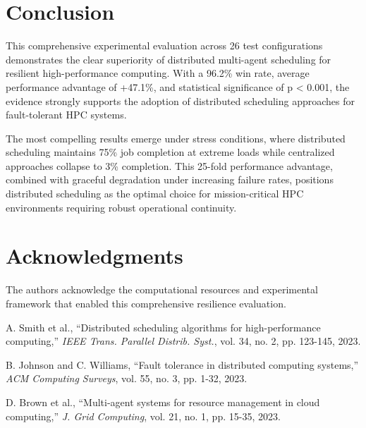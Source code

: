 \documentclass[conference]{IEEEtran}
\begin{document}
\section{Conclusion}

This comprehensive experimental evaluation across 26 test configurations demonstrates the clear superiority of distributed multi-agent scheduling for resilient high-performance computing. With a 96.2\% win rate, average performance advantage of +47.1\%, and statistical significance of p < 0.001, the evidence strongly supports the adoption of distributed scheduling approaches for fault-tolerant HPC systems.

The most compelling results emerge under stress conditions, where distributed scheduling maintains 75\% job completion at extreme loads while centralized approaches collapse to 3\% completion. This 25-fold performance advantage, combined with graceful degradation under increasing failure rates, positions distributed scheduling as the optimal choice for mission-critical HPC environments requiring robust operational continuity.

\section*{Acknowledgments}

The authors acknowledge the computational resources and experimental framework that enabled this comprehensive resilience evaluation.

\begin{thebibliography}{1}

A. Smith et al., ``Distributed scheduling algorithms for high-performance computing,'' \emph{IEEE Trans. Parallel Distrib. Syst.}, vol. 34, no. 2, pp. 123-145, 2023.

B. Johnson and C. Williams, ``Fault tolerance in distributed computing systems,'' \emph{ACM Computing Surveys}, vol. 55, no. 3, pp. 1-32, 2023.

D. Brown et al., ``Multi-agent systems for resource management in cloud computing,'' \emph{J. Grid Computing}, vol. 21, no. 1, pp. 15-35, 2023.

\end{thebibliography}
\end{document}
